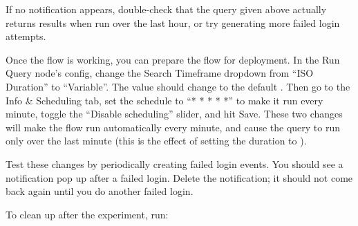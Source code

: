 If no notification appears, double-check that the query given above actually returns results when run over the last hour, or try generating more failed login attempts.

Once the flow is working, you can prepare the flow for deployment.  In the Run Query node's config, change the Search Timeframe dropdown from ``ISO Duration'' to ``Variable''. The value should change to the default . Then go to the Info \& Scheduling tab, set the schedule to ``* * * * *'' to make it run every minute, toggle the ``Disable scheduling'' slider, and hit Save. These two changes will make the flow run automatically every minute, and cause the query to run only over the last minute (this is the effect of setting the duration to ).

Test these changes by periodically creating failed login events. You should see a notification pop up after a failed login. Delete the notification; it should not come back again until you do another failed login.

To clean up after the experiment, run:

